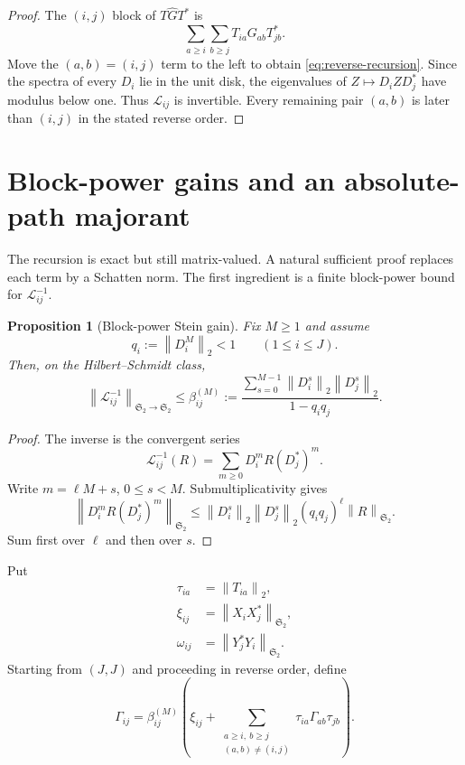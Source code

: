 \documentclass[11pt]{article}
\newtheorem{proposition}[theorem]{Proposition}
\theoremstyle{remark}
\newcommand{\norm}[1]{\left\lVert#1\right\rVert}
\newcommand{\HS}{\mathfrak S_2}
\begin{document}
\begin{proof}
The $(i,j)$ block of $T\widehat GT^*$ is
\[
 \sum_{a\ge i}\sum_{b\ge j}T_{ia}G_{ab}T_{jb}^*.
\]
Move the $(a,b)=(i,j)$ term to the left to obtain
\eqref{eq:reverse-recursion}.  Since the spectra of every $D_i$ lie in the
unit disk, the eigenvalues of $Z\mapsto D_iZD_j^*$ have modulus below one.
Thus $\mathcal L_{ij}$ is invertible.  Every remaining pair $(a,b)$ is later
than $(i,j)$ in the stated reverse order.
\end{proof}

\section{Block-power gains and an absolute-path majorant}
\label{sec:majorant}

The recursion is exact but still matrix-valued.  A natural sufficient proof
replaces each term by a Schatten norm.  The first ingredient is a finite
block-power bound for $\mathcal L_{ij}^{-1}$.

\begin{proposition}[Block-power Stein gain]
\label{prop:block-gain}
Fix $M\ge1$ and assume
\begin{equation}
 q_i:=\norm{D_i^M}_2<1
 \qquad(1\le i\le J).
 \label{eq:block-contraction}
\end{equation}
Then, on the Hilbert--Schmidt class,
\begin{equation}
 \norm{\mathcal L_{ij}^{-1}}_{\HS\to\HS}
 \le
 \boxed{
 \beta_{ij}^{(M)}:=
 \frac{\displaystyle\sum_{s=0}^{M-1}
       \norm{D_i^s}_2\norm{D_j^s}_2}
      {1-q_iq_j}.}
 \label{eq:block-gain}
\end{equation}
\end{proposition}

\begin{proof}
The inverse is the convergent series
\[
 \mathcal L_{ij}^{-1}(R)
 =\sum_{m\ge0}D_i^mR(D_j^*)^m.
\]
Write $m=\ell M+s$, $0\le s<M$.  Submultiplicativity gives
\[
 \norm{D_i^mR(D_j^*)^m}_{\HS}
 \le\norm{D_i^s}_2\norm{D_j^s}_2(q_iq_j)^\ell
 \norm R_{\HS}.
\]
Sum first over $\ell$ and then over $s$.
\end{proof}

Put
\begin{align}
 \tau_{ia}&=\norm{T_{ia}}_2,\\
 \xi_{ij}&=\norm{X_iX_j^*}_{\HS},\\
 \omega_{ij}&=\norm{Y_j^*Y_i}_{\HS}.
 \label{eq:scalar-data}
\end{align}
Starting from $(J,J)$ and proceeding in reverse order, define
\begin{equation}
 \Gamma_{ij}=\beta_{ij}^{(M)}\!\left(
 \xi_{ij}+
 \sum_{\substack{a\ge i,\ b\ge j\\(a,b)\ne(i,j)}}
 \tau_{ia}\Gamma_{ab}\tau_{jb}
 \right).
 \label{eq:gamma-recursion}
\end{equation}
\end{document}
